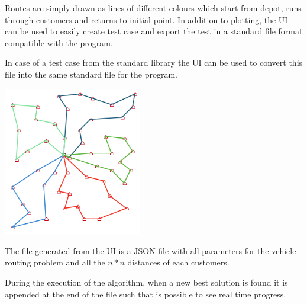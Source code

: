 \documentclass[twoside]{article}
\begin{document}
\begin{multicols}{2}
Routes are simply drawn as lines of different colours which start from depot, runs through customers and returns to initial point.\newline
In addition to plotting, the UI can be used to easily create test case and export the test in a standard file format compatible with the program.

In case of  a test case from the standard library the UI can be used to convert this file into the same standard file for the program.

\begin{center}
	\includegraphics[height=6.5cm]{ui-sample.png}
\end{center}

The file generated from the UI is a JSON file with all parameters for the vehicle routing problem and all the $n*n$ distances of each customers.

During the execution of the algorithm, when a new best solution is found it is appended at the end of the file such that is possible to see real time progress. 



\end{multicols}
\end{document}
